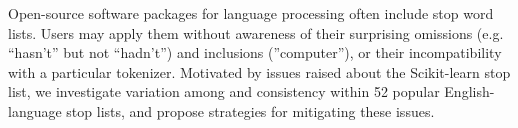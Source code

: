 Open-source software packages for language processing often include stop word lists. Users may apply them without awareness of their surprising omissions (e.g. ``hasn't'' but not ``hadn't'') and inclusions (''computer''), or their incompatibility with a particular tokenizer. Motivated by issues raised about the Scikit-learn stop list, we investigate variation among and consistency within 52 popular English-language stop lists, and propose strategies for mitigating these issues.
